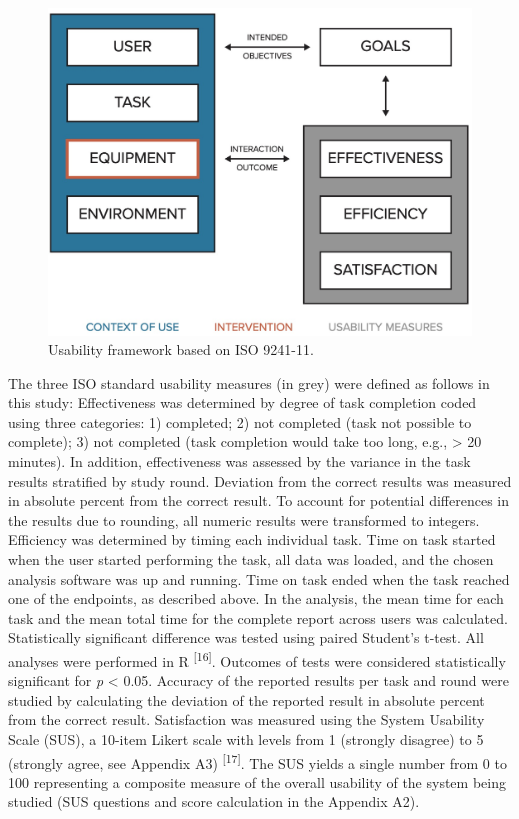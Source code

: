 \documentclass[
]{book}
\begin{document}
\begin{figure}

{\centering \includegraphics[width=0.5\linewidth]{images/06-03} 

}

\caption{Usability framework based on ISO 9241-11.}\label{fig:fig6-3}
\end{figure}

The three ISO standard usability measures (in grey) were defined as follows in this study: Effectiveness was determined by degree of task completion coded using three categories: 1) completed; 2) not completed (task not possible to complete); 3) not completed (task completion would take too long, e.g., \textgreater{} 20 minutes). In addition, effectiveness was assessed by the variance in the task results stratified by study round. Deviation from the correct results was measured in absolute percent from the correct result. To account for potential differences in the results due to rounding, all numeric results were transformed to integers. Efficiency was determined by timing each individual task. Time on task started when the user started performing the task, all data was loaded, and the chosen analysis software was up and running. Time on task ended when the task reached one of the endpoints, as described above. In the analysis, the mean time for each task and the mean total time for the complete report across users was calculated. Statistically significant difference was tested using paired Student's t-test. All analyses were performed in R \textsuperscript{{[}16{]}}. Outcomes of tests were considered statistically significant for \emph{p} \textless{} 0.05. Accuracy of the reported results per task and round were studied by calculating the deviation of the reported result in absolute percent from the correct result. Satisfaction was measured using the System Usability Scale (SUS), a 10-item Likert scale with levels from 1 (strongly disagree) to 5 (strongly agree, see Appendix A3) \textsuperscript{{[}17{]}}. The SUS yields a single number from 0 to 100 representing a composite measure of the overall usability of the system being studied (SUS questions and score calculation in the Appendix A2).
\end{document}
